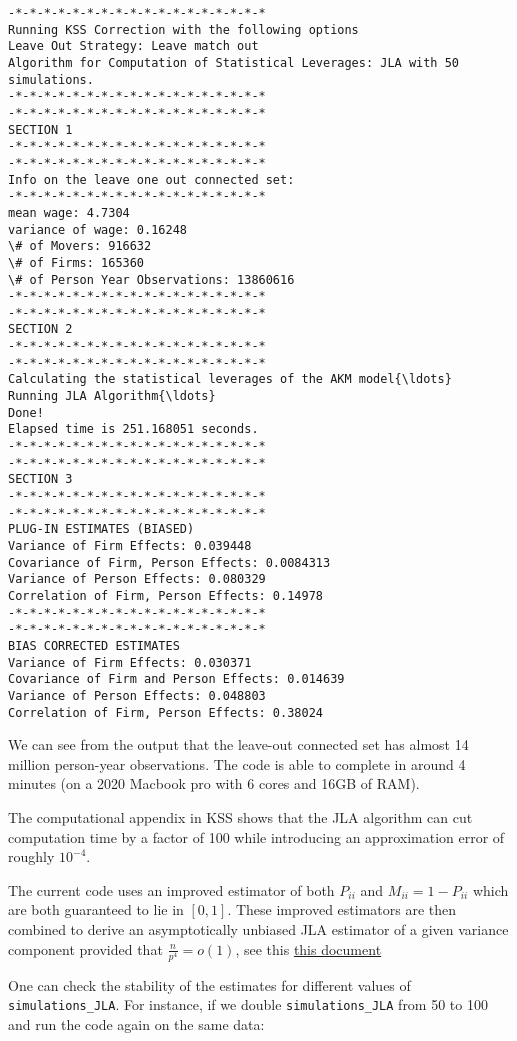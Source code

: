 \documentclass[11pt]{article}
\begin{document}
    \begin{Verbatim}[commandchars=\\\{\}]
-*-*-*-*-*-*-*-*-*-*-*-*-*-*-*-*-*-*
Running KSS Correction with the following options
Leave Out Strategy: Leave match out
Algorithm for Computation of Statistical Leverages: JLA with 50 simulations.
-*-*-*-*-*-*-*-*-*-*-*-*-*-*-*-*-*-*
-*-*-*-*-*-*-*-*-*-*-*-*-*-*-*-*-*-*
SECTION 1
-*-*-*-*-*-*-*-*-*-*-*-*-*-*-*-*-*-*
-*-*-*-*-*-*-*-*-*-*-*-*-*-*-*-*-*-*
Info on the leave one out connected set:
-*-*-*-*-*-*-*-*-*-*-*-*-*-*-*-*-*-*
mean wage: 4.7304
variance of wage: 0.16248
\# of Movers: 916632
\# of Firms: 165360
\# of Person Year Observations: 13860616
-*-*-*-*-*-*-*-*-*-*-*-*-*-*-*-*-*-*
-*-*-*-*-*-*-*-*-*-*-*-*-*-*-*-*-*-*
SECTION 2
-*-*-*-*-*-*-*-*-*-*-*-*-*-*-*-*-*-*
-*-*-*-*-*-*-*-*-*-*-*-*-*-*-*-*-*-*
Calculating the statistical leverages of the AKM model{\ldots}
Running JLA Algorithm{\ldots}
Done!
Elapsed time is 251.168051 seconds.
-*-*-*-*-*-*-*-*-*-*-*-*-*-*-*-*-*-*
-*-*-*-*-*-*-*-*-*-*-*-*-*-*-*-*-*-*
SECTION 3
-*-*-*-*-*-*-*-*-*-*-*-*-*-*-*-*-*-*
-*-*-*-*-*-*-*-*-*-*-*-*-*-*-*-*-*-*
PLUG-IN ESTIMATES (BIASED)
Variance of Firm Effects: 0.039448
Covariance of Firm, Person Effects: 0.0084313
Variance of Person Effects: 0.080329
Correlation of Firm, Person Effects: 0.14978
-*-*-*-*-*-*-*-*-*-*-*-*-*-*-*-*-*-*
-*-*-*-*-*-*-*-*-*-*-*-*-*-*-*-*-*-*
BIAS CORRECTED ESTIMATES
Variance of Firm Effects: 0.030371
Covariance of Firm and Person Effects: 0.014639
Variance of Person Effects: 0.048803
Correlation of Firm, Person Effects: 0.38024
    \end{Verbatim}

    We can see from the output that the leave-out connected set has almost
14 million person-year observations. The code is able to complete in
around 4 minutes (on a 2020 Macbook pro with 6 cores and 16GB of RAM).

The computational appendix in KSS shows that the JLA algorithm can cut
computation time by a factor of 100 while introducing an approximation
error of roughly \(10^{-4}\).

The current code uses an improved estimator of both \(P_{ii}\) and
\(M_{ii}=1-P_{ii}\) which are both guaranteed to lie in \([0,1]\). These
improved estimators are then combined to derive an asymptotically unbiased JLA
estimator of a given variance component provided that
\(\frac{n}{p^{4}}=o(1)\), see this \href{https://www.dropbox.com/s/i28yvzae2tnp2tl/improved_JLA.pdf?dl=1}{this document}

One can check the stability of the estimates for different values of
\texttt{simulations\_JLA}. For instance, if we double
\texttt{simulations\_JLA} from 50 to 100 and run the code again on the
same data:
\end{document}
